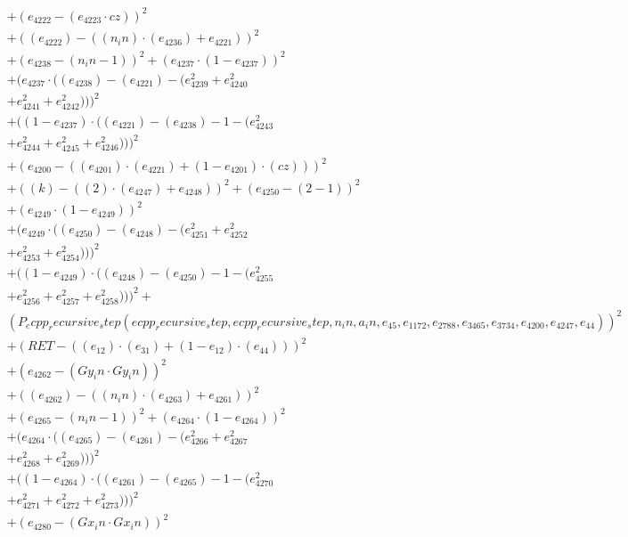 \documentclass[10pt, a4paper]{article}
\begin{document}
\begin{small}
\begin{align*}
& + (e_{4222} - (e_{4223}  \cdot  cz))^{2} \\
& + ((e_{4222}) - ((n_in)  \cdot  (e_{4236}) + e_{4221}))^{2} \\
& + (e_{4238} - (n_in - 1))^{2} + (e_{4237}  \cdot  (1 - e_{4237}))^{2} \\
& + (e_{4237}  \cdot  ((e_{4238}) - (e_{4221}) - (e_{4239}^{2} + e_{4240}^{2} \\
& + e_{4241}^{2} + e_{4242}^{2})))^{2} \\
& + ((1 - e_{4237})  \cdot  ((e_{4221}) - (e_{4238}) - 1 - (e_{4243}^{2} \\
& + e_{4244}^{2} + e_{4245}^{2} + e_{4246}^{2})))^{2} \\
& + (e_{4200} - ((e_{4201})  \cdot  (e_{4221}) + (1 - e_{4201})  \cdot  (cz)))^{2} \\
& + ((k) - ((2)  \cdot  (e_{4247}) + e_{4248}))^{2} + (e_{4250} - (2 - 1))^{2} \\
& + (e_{4249}  \cdot  (1 - e_{4249}))^{2} \\
& + (e_{4249}  \cdot  ((e_{4250}) - (e_{4248}) - (e_{4251}^{2} + e_{4252}^{2} \\
& + e_{4253}^{2} + e_{4254}^{2})))^{2} \\
& + ((1 - e_{4249})  \cdot  ((e_{4248}) - (e_{4250}) - 1 - (e_{4255}^{2} \\
& + e_{4256}^{2} + e_{4257}^{2} + e_{4258}^{2})))^{2} + \\
& (P_ecpp_recursive_step(ecpp_recursive_step, ecpp_recursive_step, n_in, a_in, e_{45}, e_{1172}, e_{2788}, e_{3465}, e_{3734}, e_{4200}, e_{4247}, e_{44}))^{2} \\
& + (RET - ((e_{12})  \cdot  (e_{31}) + (1 - e_{12})  \cdot  (e_{44})))^{2} \\
& + (e_{4262} - (Gy_in  \cdot  Gy_in))^{2} \\
& + ((e_{4262}) - ((n_in)  \cdot  (e_{4263}) + e_{4261}))^{2} \\
& + (e_{4265} - (n_in - 1))^{2} + (e_{4264}  \cdot  (1 - e_{4264}))^{2} \\
& + (e_{4264}  \cdot  ((e_{4265}) - (e_{4261}) - (e_{4266}^{2} + e_{4267}^{2} \\
& + e_{4268}^{2} + e_{4269}^{2})))^{2} \\
& + ((1 - e_{4264})  \cdot  ((e_{4261}) - (e_{4265}) - 1 - (e_{4270}^{2} \\
& + e_{4271}^{2} + e_{4272}^{2} + e_{4273}^{2})))^{2} \\
& + (e_{4280} - (Gx_in  \cdot  Gx_in))^{2} \\

\end{align*}
\end{small}
\end{document}

